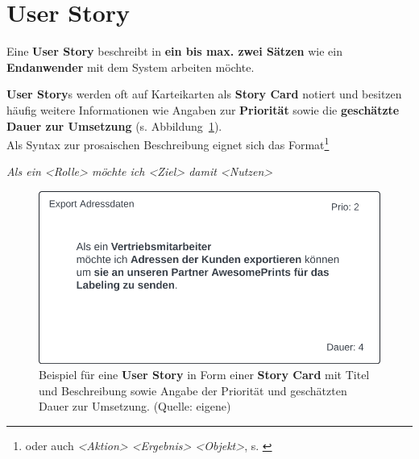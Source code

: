 \section{User Story}

\begin{tcolorbox}
Eine \textbf{User Story} beschreibt in \textbf{ein bis max. zwei Sätzen} wie ein \textbf{Endanwender} mit dem System arbeiten möchte.
\end{tcolorbox}


\noindent
\textbf{User Story}s werden oft auf Karteikarten als \textbf{Story Card} notiert und besitzen häufig weitere Informationen wie Angaben zur \textbf{Priorität} sowie die \textbf{geschätzte Dauer zur Umsetzung} (s. Abbildung~\ref{fig:storycard}).\\

\noindent
Als Syntax zur prosaischen Beschreibung eignet sich das Format\footnote{oder auch  \textit{<Aktion> <Ergebnis> <Objekt>}, s. \cite[241]{Coh09}}

\begin{center}
    \textit{Als ein <Rolle> möchte ich <Ziel> damit <Nutzen>}
\end{center}

\begin{figure}
    \centering
    \includegraphics[scale=0.4]{chapters/Anhang/CheatSheets/img/StoryCard}
    \caption{Beispiel für eine \textbf{User Story} in Form einer \textbf{Story Card} mit Titel und Beschreibung sowie Angabe der Priorität und geschätzten Dauer zur Umsetzung. (Quelle: eigene)}
    \label{fig:storycard}
\end{figure}
